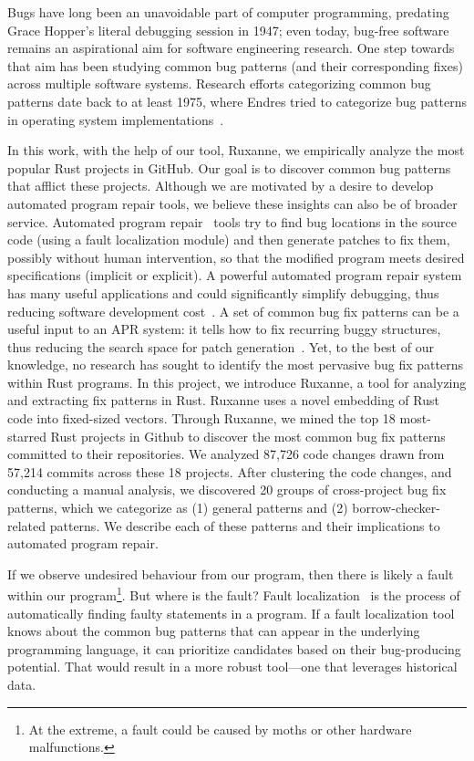 Bugs have long been an unavoidable part of computer programming, predating Grace Hopper's literal debugging session in 1947; even today, bug-free software remains an aspirational aim for software engineering research. One step towards that aim has been studying common bug patterns (and their corresponding fixes) across multiple software systems. Research efforts categorizing common bug patterns date back to at least 1975, where Endres tried to categorize bug patterns in operating system implementations~\citep{endres1975analysis}.  

In this work, with the help of our tool, Ruxanne, we empirically analyze the most popular Rust projects in GitHub. Our goal is to discover common bug patterns that afflict these projects. Although we are motivated by a desire to develop automated program repair tools, we believe these insights can also be of broader service. Automated program repair~\citep{goues2019automated,liu2018survey} tools try to find bug locations in the source code (using a fault localization module) and then generate patches to fix them, possibly without human intervention, so that the modified program meets desired specifications (implicit or explicit). A powerful automated program repair system has many useful applications and could significantly simplify debugging, thus reducing software development cost~\citep{le2012systematic}. A set of common bug fix patterns can be a useful input to an APR system: it tells how to fix recurring buggy structures, thus reducing the search space for patch generation~\citep{jeffrey2009bugfix}. 
Yet, to the best of our knowledge, no research has sought to identify the most pervasive bug fix patterns within Rust programs. In this project, we introduce Ruxanne, a tool for analyzing and extracting fix patterns in Rust. Ruxanne uses a novel embedding of Rust code into fixed-sized vectors. Through Ruxanne, we mined the top 18 most-starred Rust projects in Github to discover the most common bug fix patterns committed to their repositories. We analyzed 87,726 code changes drawn from 57,214 commits across these 18 projects. After clustering the code changes, and conducting a manual analysis, we discovered 20 groups of cross-project bug fix patterns, which we categorize as (1) general patterns and (2) borrow-checker-related patterns. We describe each of these patterns and their implications to automated program repair.

If we observe undesired behaviour from our program, then there is likely a fault within our program\footnote{At the extreme, a fault could be caused by moths or other hardware malfunctions.}. But where is the fault? Fault localization~\citep{wong2016survey} is the process of automatically finding faulty statements in a program. If a fault localization tool knows about the common bug patterns that can appear in the underlying programming language, it can prioritize candidates based on their bug-producing potential. That would result in a more robust tool---one that leverages historical data.

